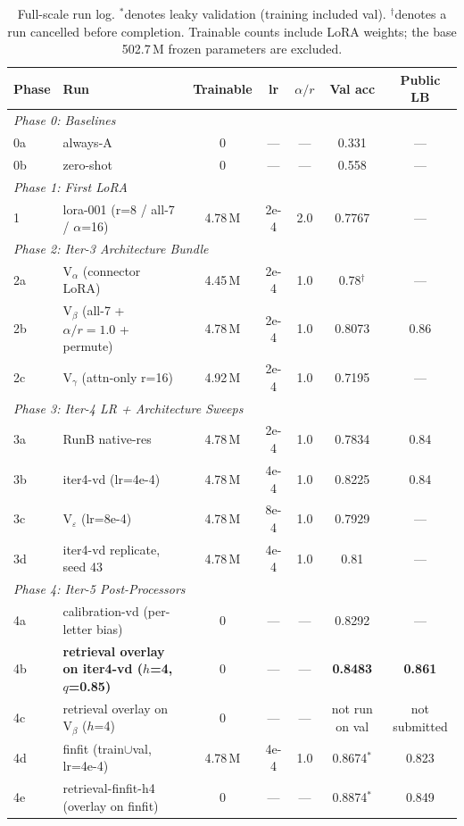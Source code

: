 \documentclass[11pt]{article}
\begin{document}
\begin{table}[t]
\small
\begin{tabular}{@{}llccccc@{}}
\toprule
\textbf{Phase} & \textbf{Run} & \textbf{Trainable} & \textbf{lr} & \textbf{$\alpha/r$} & \textbf{Val acc} & \textbf{Public LB} \\
\midrule
\multicolumn{7}{l}{\textit{Phase 0: Baselines}} \\
0a & always-A & 0 & --- & --- & 0.331 & --- \\
0b & zero-shot & 0 & --- & --- & 0.558 & --- \\
\midrule
\multicolumn{7}{l}{\textit{Phase 1: First LoRA}} \\
1 & lora-001 (r=8 / all-7 / $\alpha$=16) & 4.78\,M & 2e-4 & 2.0 & 0.7767 & --- \\
\midrule
\multicolumn{7}{l}{\textit{Phase 2: Iter-3 Architecture Bundle}} \\
2a & V$_\alpha$ (connector LoRA) & 4.45\,M & 2e-4 & 1.0 & 0.78$^\dagger$ & --- \\
2b & V$_\beta$ (all-7 + $\alpha/r=1.0$ + permute) & 4.78\,M & 2e-4 & 1.0 & 0.8073 & 0.86 \\
2c & V$_\gamma$ (attn-only r=16) & 4.92\,M & 2e-4 & 1.0 & 0.7195 & --- \\
\midrule
\multicolumn{7}{l}{\textit{Phase 3: Iter-4 LR + Architecture Sweeps}} \\
3a & RunB native-res & 4.78\,M & 2e-4 & 1.0 & 0.7834 & 0.84 \\
3b & iter4-vd (lr=4e-4) & 4.78\,M & 4e-4 & 1.0 & 0.8225 & 0.84 \\
3c & V$_\varepsilon$ (lr=8e-4) & 4.78\,M & 8e-4 & 1.0 & 0.7929 & --- \\
3d & iter4-vd replicate, seed 43 & 4.78\,M & 4e-4 & 1.0 & 0.81 & --- \\
\midrule
\multicolumn{7}{l}{\textit{Phase 4: Iter-5 Post-Processors}} \\
4a & calibration-vd (per-letter bias) & 0 & --- & --- & 0.8292 & --- \\
4b & \textbf{retrieval overlay on iter4-vd ($h$=4, $q$=0.85)} & 0 & --- & --- & \textbf{0.8483} & \textbf{0.861} \\
4c & retrieval overlay on V$_\beta$ ($h$=4) & 0 & --- & --- & not run on val & not submitted \\
4d & finfit (train$\cup$val, lr=4e-4) & 4.78\,M & 4e-4 & 1.0 & 0.8674$^*$ & 0.823 \\
4e & retrieval-finfit-h4 (overlay on finfit) & 0 & --- & --- & 0.8874$^*$ & 0.849 \\
\bottomrule
\end{tabular}
\caption{Full-scale run log. $^*$denotes leaky validation (training included val). $^\dagger$denotes a run cancelled before completion. Trainable counts include LoRA weights; the base 502.7\,M frozen parameters are excluded.}
\label{tab:full-log}
\end{table}
\end{document}
